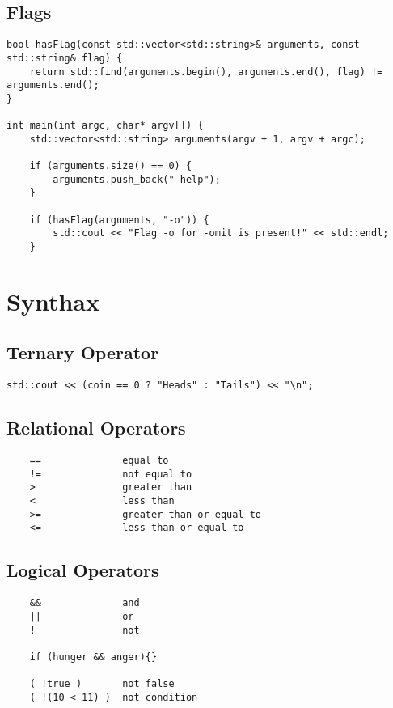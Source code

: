\subsection{Flags}

\begin{verbatim}
bool hasFlag(const std::vector<std::string>& arguments, const std::string& flag) {
    return std::find(arguments.begin(), arguments.end(), flag) != arguments.end();
}

int main(int argc, char* argv[]) {
    std::vector<std::string> arguments(argv + 1, argv + argc);

    if (arguments.size() == 0) {
        arguments.push_back("-help");
    }

    if (hasFlag(arguments, "-o")) {
        std::cout << "Flag -o for -omit is present!" << std::endl;
    }
\end{verbatim}

\section{Synthax}
\subsection{Ternary Operator}
\begin{verbatim}
std::cout << (coin == 0 ? "Heads" : "Tails") << "\n";
\end{verbatim}

\subsection{Relational Operators}

\begin{verbatim}
    ==              equal to
    !=              not equal to
    >               greater than
    <               less than
    >=              greater than or equal to
    <=              less than or equal to
\end{verbatim}

\subsection{Logical Operators}

\begin{verbatim}
    &&              and 
    ||              or
    !               not

    if (hunger && anger){}

    ( !true )       not false
    ( !(10 < 11) )  not condition 
\end{verbatim}

